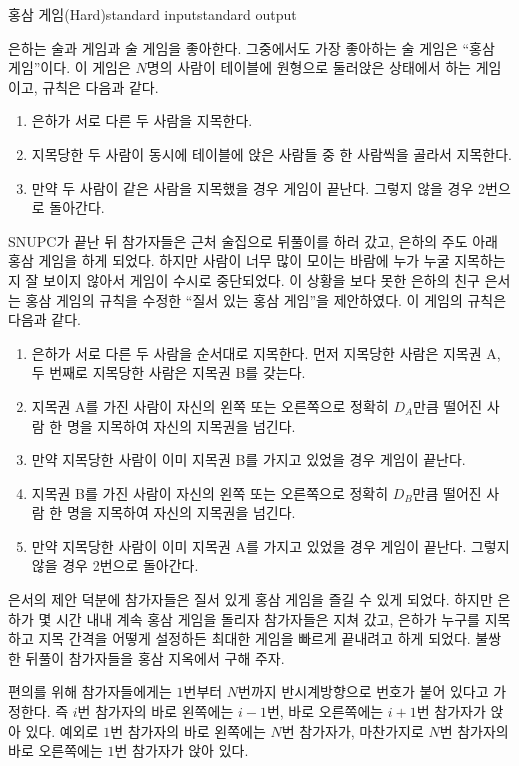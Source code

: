 \begin{problem}{홍삼 게임(Hard)}{standard input}{standard output}

은하는 술과 게임과 술 게임을 좋아한다. 그중에서도 가장 좋아하는 술 게임은 ``홍삼 게임''이다. 이 게임은 $N$명의 사람이 테이블에 원형으로 둘러앉은 상태에서 하는 게임이고, 규칙은 다음과 같다.

\begin{enumerate}
\item{은하가 서로 다른 두 사람을 지목한다.}
\item{지목당한 두 사람이 동시에 테이블에 앉은 사람들 중 한 사람씩을 골라서 지목한다.}
\item{만약 두 사람이 같은 사람을 지목했을 경우 게임이 끝난다. 그렇지 않을 경우 2번으로 돌아간다.}
\end{enumerate}

SNUPC가 끝난 뒤 참가자들은 근처 술집으로 뒤풀이를 하러 갔고, 은하의 주도 아래 홍삼 게임을 하게 되었다. 하지만 사람이 너무 많이 모이는 바람에 누가 누굴 지목하는지 잘 보이지 않아서 게임이 수시로 중단되었다. 이 상황을 보다 못한 은하의 친구 은서는 홍삼 게임의 규칙을 수정한 ``질서 있는 홍삼 게임''을 제안하였다. 이 게임의 규칙은 다음과 같다.

\begin{enumerate}
\item{은하가 서로 다른 두 사람을 순서대로 지목한다. 먼저 지목당한 사람은 지목권 A, 두 번째로 지목당한 사람은 지목권 B를 갖는다.}
\item{지목권 A를 가진 사람이 자신의 왼쪽 또는 오른쪽으로 정확히 $D_{A}$만큼 떨어진 사람 한 명을 지목하여 자신의 지목권을 넘긴다.}
\item{만약 지목당한 사람이 이미 지목권 B를 가지고 있었을 경우 게임이 끝난다.}
\item{지목권 B를 가진 사람이 자신의 왼쪽 또는 오른쪽으로 정확히 $D_{B}$만큼 떨어진 사람 한 명을 지목하여 자신의 지목권을 넘긴다.}
\item{만약 지목당한 사람이 이미 지목권 A를 가지고 있었을 경우 게임이 끝난다. 그렇지 않을 경우 2번으로 돌아간다.}
\end{enumerate}

은서의 제안 덕분에 참가자들은 질서 있게 홍삼 게임을 즐길 수 있게 되었다. 하지만 은하가 몇 시간 내내 계속 홍삼 게임을 돌리자 참가자들은 지쳐 갔고, 은하가 누구를 지목하고 지목 간격을 어떻게 설정하든 최대한 게임을 빠르게 끝내려고 하게 되었다. 불쌍한 뒤풀이 참가자들을 홍삼 지옥에서 구해 주자.

편의를 위해 참가자들에게는 $1$번부터 $N$번까지 반시계방향으로 번호가 붙어 있다고 가정한다. 즉 $i$번 참가자의 바로 왼쪽에는 $i-1$번, 바로 오른쪽에는 $i+1$번 참가자가 앉아 있다. 예외로 $1$번 참가자의 바로 왼쪽에는 $N$번 참가자가, 마찬가지로 $N$번 참가자의 바로 오른쪽에는 $1$번 참가자가 앉아 있다.


\end{problem}
